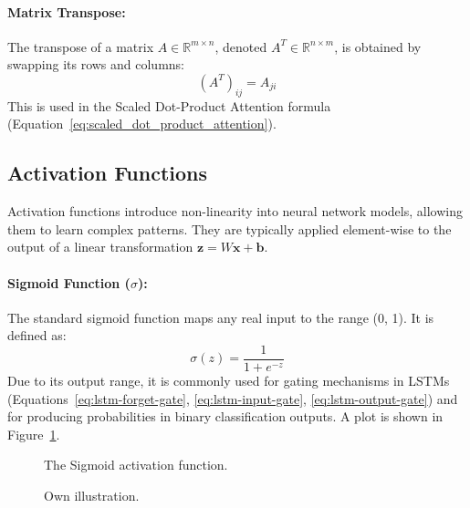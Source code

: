 \begin{appendices}
  \paragraph{Matrix Transpose:}
  The transpose of a matrix \( A \in \mathbb{R}^{m \times n} \), denoted \( A^T \in \mathbb{R}^{n \times m} \), is obtained by swapping its rows and columns:
  \begin{equation}
    (A^T)_{ij} = A_{ji}
  \end{equation}
  This is used in the Scaled Dot-Product Attention formula (Equation~\ref{eq:scaled_dot_product_attention}).


  \subsection{Activation Functions}

  Activation functions introduce non-linearity into neural network models, allowing them to learn complex patterns. They are typically applied element-wise to the output of a linear transformation \( \bm{z} = W\bm{x} + \bm{b} \).

  \paragraph{Sigmoid Function (\( \sigma \)):}
  The standard sigmoid function maps any real input to the range (0, 1). It is defined as:
  \begin{equation}
    \sigma(z) = \frac{1}{1 + e^{-z}}
  \end{equation}
  Due to its output range, it is commonly used for gating mechanisms in LSTMs (Equations~\ref{eq:lstm-forget-gate}, \ref{eq:lstm-input-gate}, \ref{eq:lstm-output-gate}) and for producing probabilities in binary classification outputs. A plot is shown in Figure~\ref{fig:sigmoid_plot}.

  \begin{figure}[htbp]
    \centering
    \caption[Sigmoid Activation Function]{The Sigmoid activation function.}
    \label{fig:sigmoid_plot}
    \caption*{Own illustration.}
  \end{figure}



\end{appendices}
